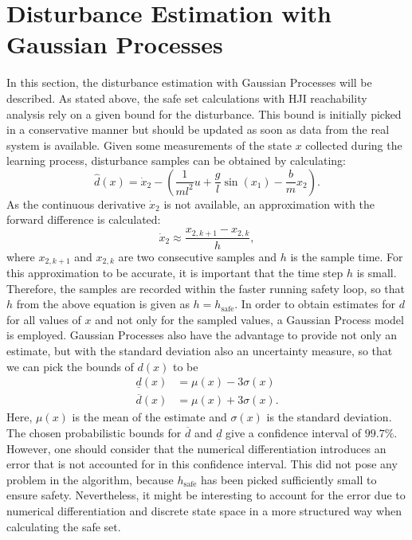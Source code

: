 \documentclass[../main.tex]{subfiles}
\begin{document}
\section{Disturbance Estimation with Gaussian Processes}\label{sec:implementation_GP}
In this section, the disturbance estimation with Gaussian Processes will be described. As stated above, the safe set calculations with HJI reachability analysis rely on a given bound for the disturbance. This bound is initially picked in a conservative manner but should be updated as soon as data from the real system is available. Given some measurements of the state $x$ collected during the learning process, disturbance samples can be obtained by calculating:
\begin{equation}
    \hat{d}(x)=\dot{x}_2-\left(\frac{1}{ml^2}u+\frac{g}{l}\sin(x_1)-\frac{b}{m}x_2\right).
\end{equation}
As the continuous derivative $\dot{x}_2$ is not available, an approximation with the forward difference is calculated:
\begin{equation}
    \dot{x}_2 \approx \frac{x_{2,k+1}-x_{2,k}}{h},
\end{equation}
where $x_{2,k+1}$ and $x_{2,k}$ are two consecutive samples and $h$ is the sample time.
For this approximation to be accurate, it is important that the time step $h$ is small. Therefore, the samples are recorded within the faster running safety loop, so that $h$ from the above equation is given as $h = h_{\text{safe}}$.
In order to obtain estimates for $d$ for all values of $x$ and not only for the sampled values, a Gaussian Process model is employed. Gaussian Processes also have the advantage to provide not only an estimate, but with the standard deviation also an uncertainty measure, so that we can pick the bounds of $d(x)$ to be
\begin{align}
    \underline{d}(x) &= \mu(x)-3\sigma(x)\\
    \overline{d}(x) &= \mu(x)+3\sigma(x).
\end{align}
Here, $\mu(x)$ is the mean of the estimate and $\sigma(x)$ is the standard deviation. The chosen  probabilistic bounds for $\overline{d}$ and $\underline{d}$ give a confidence interval of $99.7\%$. However, one should consider that the numerical differentiation introduces an error that is not accounted for in this confidence interval. This did not pose any problem in the algorithm, because $h_{\text{safe}}$ has been picked sufficiently small to ensure safety. Nevertheless, it might be interesting to account for the error due to numerical differentiation and discrete state space in a more structured way when calculating the safe set. \par
\end{document}
